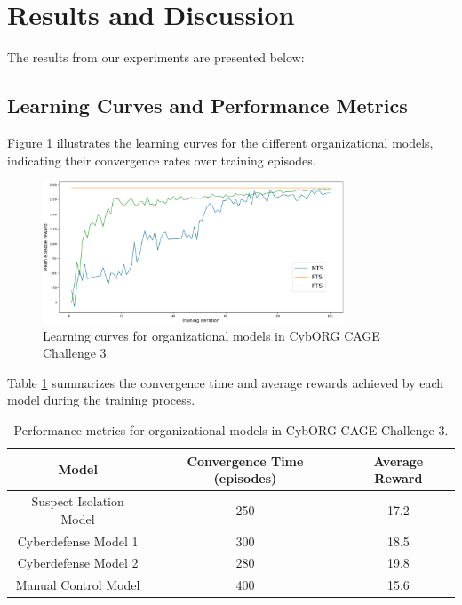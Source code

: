 \documentclass[conference]{IEEEtran}
\begin{document}
\section{Results and Discussion}\label{sec:results_and_discussion}

The results from our experiments are presented below:

\subsection{Learning Curves and Performance Metrics}

Figure \ref{fig:learning_curves} illustrates the learning curves for the different organizational models, indicating their convergence rates over training episodes.

\begin{figure}[ht]
    \centering
    \includegraphics[width=0.8\textwidth]{figures/prahom_learning_curve.png}
    \caption{Learning curves for organizational models in CybORG CAGE Challenge 3.}
    \label{fig:learning_curves}
\end{figure}

Table \ref{tab:results} summarizes the convergence time and average rewards achieved by each model during the training process.

\begin{table}[ht]
    \centering
    \begin{tabular}{|c|c|c|}
        \hline
        Model                   & Convergence Time (episodes) & Average Reward \\
        \hline
        Suspect Isolation Model & 250                         & 17.2           \\
        Cyberdefense Model 1    & 300                         & 18.5           \\
        Cyberdefense Model 2    & 280                         & 19.8           \\
        Manual Control Model    & 400                         & 15.6           \\
        \hline
    \end{tabular}
    \caption{Performance metrics for organizational models in CybORG CAGE Challenge 3.}
    \label{tab:results}
\end{table}
\end{document}
